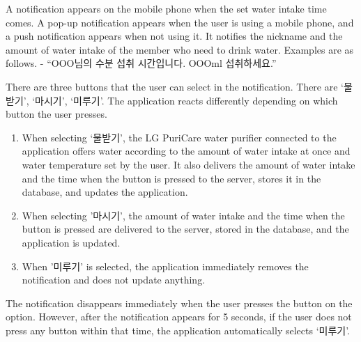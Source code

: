 \documentclass[conference]{IEEEtran}
\begin{document}
\begin{itemize}
 A notification appears on the mobile phone when the set water intake time comes. A pop-up notification appears when the user is using a mobile phone, and a push notification appears when not using it. It notifies the nickname and the amount of water intake of the member who need to drink water. Examples are as follows. - “OOO님의 수분 섭취 시간입니다. OOOml 섭취하세요.”

There are three buttons that the user can select in the notification. There are ‘물받기’, ‘마시기’, ‘미루기’. The application reacts differently depending on which button the user presses.
\begin{enumerate}
\setlength{\parindent}{2ex}
\item When selecting ‘물받기’, the LG PuriCare water purifier connected to the application offers water according to the amount of water intake at once and water temperature set by the user. It also delivers the amount of water intake and the time when the button is pressed to the server, stores it in the database, and updates the application.

\item When selecting '마시기', the amount of water intake and the time when the button is pressed are delivered to the server, stored in the database, and the application is updated.

\item When '미루기' is selected, the application immediately removes the notification and does not update anything.
\end{enumerate}

The notification disappears immediately when the user presses the button on the option. However, after the notification appears for 5 seconds, if the user does not press any button within that time, the application automatically selects ‘미루기’.
\end{itemize}
\end{document}
